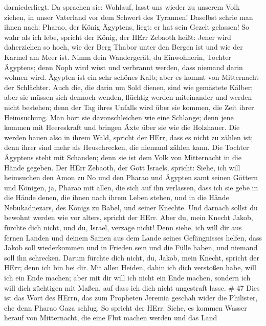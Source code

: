darniederliegt. Da sprachen sie: Wohlauf, lasst uns wieder zu unserem
Volk ziehen, in unser Vaterland vor dem Schwert des Tyrannen!
 Daselbst schrie man ihnen nach: Pharao, der König
Ägyptens, liegt: er hat sein Gezelt gelassen!  So wahr als
ich lebe, spricht der König, der HErr Zebaoth heißt: Jener wird
daherziehen so hoch, wie der Berg Thabor unter den Bergen ist und wie
der Karmel am Meer ist.  Nimm dein Wandergerät, du
Einwohnerin, Tochter Ägyptens; denn Noph wird wüst und verbrannt werden,
dass niemand darin wohnen wird.  Ägypten ist ein sehr
schönes Kalb; aber es kommt von Mitternacht der Schlächter.
 Auch die, die darin um Sold dienen, sind wie gemästete
Kälber; aber sie müssen sich dennoch wenden, flüchtig werden miteinander
und werden nicht bestehen; denn der Tag ihres Unfalls wird über sie
kommen, die Zeit ihrer Heimsuchung.  Man hört sie
davonschleichen wie eine Schlange; denn jene kommen mit Heereskraft und
bringen Äxte über sie wie die Holzhauer.  Die werden hauen
also in ihrem Wald, spricht der HErr, dass es nicht zu zählen ist; denn
ihrer sind mehr als Heuschrecken, die niemand zählen kann. 
Die Tochter Ägyptens steht mit Schanden; denn sie ist dem Volk von
Mitternacht in die Hände gegeben.  Der HErr Zebaoth, der
Gott Israels, spricht: Siehe, ich will heimsuchen den Amon zu No und den
Pharao und Ägypten samt seinen Göttern und Königen, ja, Pharao mit
allen, die sich auf ihn verlassen,  dass ich sie gebe in
die Hände denen, die ihnen nach ihrem Leben stehen, und in die Hände
Nebukadnezars, des Königs zu Babel, und seiner Knechte. Und darnach
sollst du bewohnt werden wie vor alters, spricht der HErr. 
Aber du, mein Knecht Jakob, fürchte dich nicht, und du, Israel, verzage
nicht! Denn siehe, ich will dir aus fernen Landen und deinem Samen aus
dem Lande seines Gefängnisses helfen, dass Jakob soll wiederkommen und
in Frieden sein und die Fülle haben, und niemand soll ihn schrecken.
 Darum fürchte dich nicht, du, Jakob, mein Knecht, spricht
der HErr; denn ich bin bei dir. Mit allen Heiden, dahin ich dich
verstoßen habe, will ich ein Ende machen; aber mit dir will ich nicht
ein Ende machen, sondern ich will dich züchtigen mit Maßen, auf dass ich
dich nicht ungestraft lasse. \# 47  Dies ist das Wort des
HErrn, das zum Propheten Jeremia geschah wider die Philister, ehe denn
Pharao Gaza schlug.  So spricht der HErr: Siehe, es kommen
Wasser herauf von Mitternacht, die eine Flut machen werden und das Land
